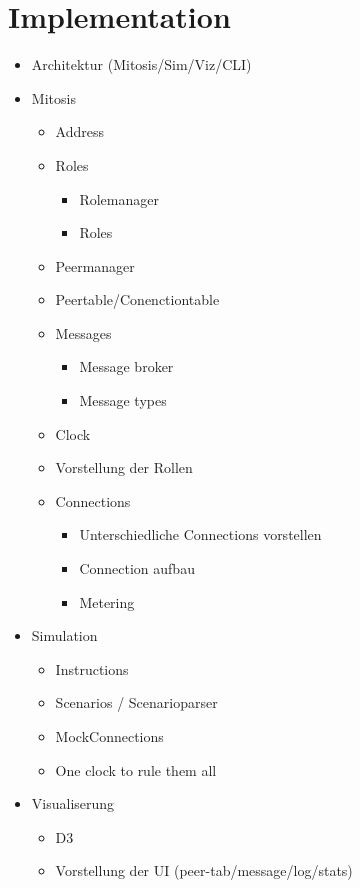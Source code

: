 
\chapter{Implementation}
\begin{itemize}
    \item Architektur (Mitosis/Sim/Viz/CLI)
    \item Mitosis
    \begin{itemize}
        \item Address
        \item Roles
        \begin{itemize}
            \item Rolemanager
            \item Roles
        \end{itemize}
        \item Peermanager
        \item Peertable/Conenctiontable
        \item Messages
        \begin{itemize}
            \item Message broker
            \item Message types
        \end{itemize}
        \item Clock
        \item Vorstellung der Rollen
        \item Connections
        \begin{itemize}
            \item Unterschiedliche Connections vorstellen
            \item Connection aufbau
            \item Metering
        \end{itemize}
    \end{itemize}
    \item Simulation
    \begin{itemize}
        \item Instructions
        \item Scenarios / Scenarioparser
        \item MockConnections
        \item One clock to rule them all
    \end{itemize}
    \item Visualiserung
    \begin{itemize}
        \item D3
        \item Vorstellung der UI (peer-tab/message/log/stats)

\end{itemize}
\end{itemize}
